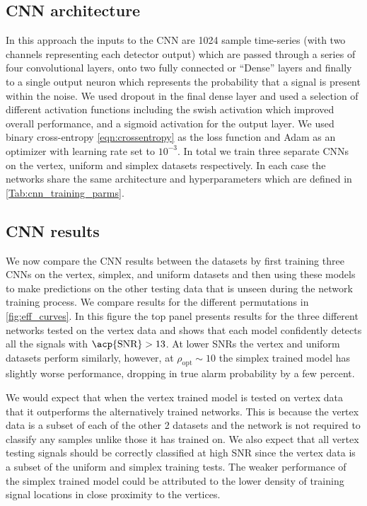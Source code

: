 \documentclass[12pt]{iopart}
\begin{document}
\subsection{CNN architecture}
In this approach the inputs to the \ac{CNN} are 1024 sample time-series (with two channels representing each detector output) which are passed through a series of four convolutional layers, onto two fully connected or ``Dense'' layers and finally to a single output neuron which represents the probability that a signal is present within the noise. We used dropout in the final dense layer and used a selection of different activation functions including the swish activation \cite{ramachandran2017searching} which improved overall performance, and a sigmoid activation for the output layer. We used binary cross-entropy \cref{eqn:crossentropy} as the loss function and Adam as an optimizer with learning rate set to $10^{-3}$. In total we train three separate \acp{CNN} on the vertex, uniform and simplex datasets respectively. In each case the networks share the same architecture and hyperparameters which are defined in \cref{Tab:cnn_training_parms}.

\subsection{CNN results}

%
We now compare the \ac{CNN} results between the datasets by first training three \acp{CNN} on the vertex, simplex, and uniform datasets and then using these models to make predictions on the other testing data that is unseen during the network training process. We compare results for the different permutations in \cref{fig:eff_curves}. In this figure the top panel presents results for the three different networks tested on the vertex data and shows that each model confidently detects all the signals with $\text{\acp{SNR}} >13$. At lower \acp{SNR} the vertex and uniform datasets perform similarly, however, at $\rho_{\text{opt}}\sim 10$ the simplex trained model has slightly worse performance, dropping in true alarm probability by a few percent.

We would expect that when the vertex trained model is tested on vertex data that it outperforms the alternatively trained networks. This is because the vertex data is a subset of each of the other 2 datasets and the network is not required to classify any samples unlike those it has trained on. We also expect that all vertex testing signals should be correctly classified at high \ac{SNR} since the vertex data is a subset of the uniform and simplex training tests. The weaker performance of the simplex trained model could be attributed to the lower density of training signal locations in close proximity to the vertices.   
\end{document}
